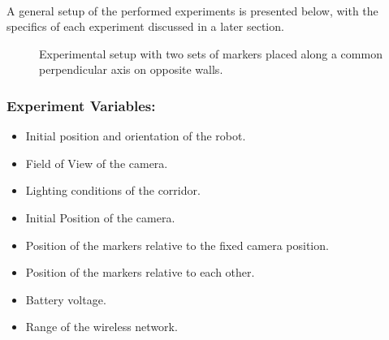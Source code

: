 \paragraph{} A general setup of the performed experiments is presented below, with the specifics of each experiment discussed in a later section.

	\begin{figure}[h!]%
		\centering
		\qquad
		\caption{Experimental setup with two sets of markers placed along a common perpendicular axis on opposite walls.}%
		\label{fig:point of view}%
	\end{figure}

\subsubsection*{Experiment Variables:}
\begin{itemize}
	\item Initial position and orientation of the robot.
	\item Field of View of the camera.
	\item Lighting conditions of the corridor.
	\item Initial Position of the camera.
	\item Position of the markers relative to the fixed camera position.
	\item Position of the markers relative to each other.
	\item Battery voltage.
	\item Range of the wireless network.
\end{itemize}

